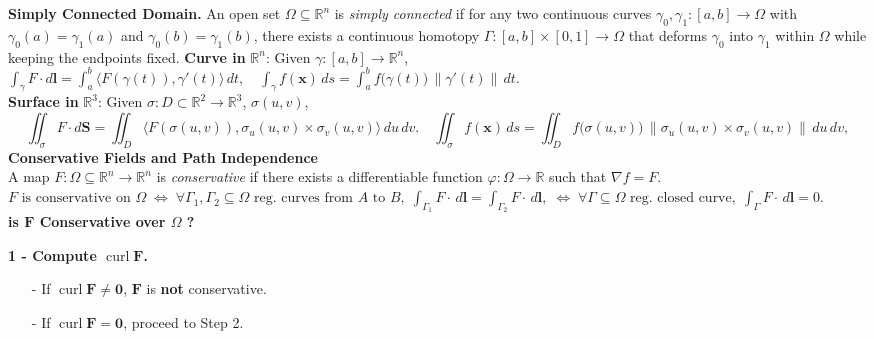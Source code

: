 \documentclass[8pt]{article}
\begin{document}
\smallskip
\noindent\textbf{Simply Connected Domain.}
An open set $\Omega \subseteq \mathbb{R}^n$ is \emph{simply connected} if for any two continuous curves
$\gamma_0, \gamma_1 : [a,b] \to \Omega$
with $\gamma_0(a) = \gamma_1(a)$ and $\gamma_0(b) = \gamma_1(b)$,
there exists a continuous homotopy
$\Gamma : [a,b]\times[0,1] \to \Omega$
that deforms $\gamma_0$ into $\gamma_1$ within $\Omega$ while keeping the endpoints fixed.
\smallskip \newline
\noindent\textbf{Curve in } $\mathbb{R}^n$: Given $\gamma : [a,b] \to \mathbb{R}^n$,$ \int_{\gamma} F \cdot d\mathbf{l} = \int_a^b \big\langle F(\gamma(t)), \gamma'(t)\big\rangle \, dt, \quad \int_{\gamma} f(\mathbf{x}) \, ds = \int_a^b f\big(\gamma(t)\big)\,\|\gamma'(t)\| \, dt.$\\
\noindent\textbf{Surface in } $\mathbb{R}^3$:
Given $\sigma : D \subset \mathbb{R}^2 \to \mathbb{R}^3$, $\sigma(u,v)$, \vspace{-10px}
\[
\iint_{\sigma} F \cdot d\mathbf{S}
= \iint_D \big\langle F(\sigma(u,v)), \sigma_u(u,v)\times\sigma_v(u,v)\big\rangle \,du\,dv.
\quad
\iint_{\sigma} f(\mathbf{x}) \, ds
= \iint_D f\big(\sigma(u,v)\big)\,\|\sigma_u(u,v)\times\sigma_v(u,v)\| \,du\,dv,
\]
\noindent \textbf{Conservative Fields and Path Independence}\\
A map \( F : \Omega \subseteq \mathbb{R}^n \to \mathbb{R}^n \) is \emph{conservative} if there exists a differentiable function \( \varphi : \Omega \to \mathbb{R} \) such that \( \nabla f = F \).\\
\small
$
F \text{ is conservative on } \Omega \; \iff \;
\forall \Gamma_1, \Gamma_2 \subseteq \Omega \text{ reg. curves from } A \text{ to } B, \; \int_{\Gamma_1} F \cdot \, d\mathbf{l} = \int_{\Gamma_2} F \cdot \, d\mathbf{l}, \;
\iff \; \forall \Gamma \subseteq \Omega \text{ reg. closed curve}, \; \int_{\Gamma} F \cdot \, d\mathbf{l} = 0.
$\\
\normalsize
\noindent\textbf{is $\mathbf{F}$ Conservative over $\Omega$ ?}\newline
\begin{minipage}[t]{0.17\textwidth}
    \noindent\textbf{1 - Compute $\operatorname{curl} \mathbf{F}$.} \vspace{-8px}
    \begin{itemize}[leftmargin=*]
        \setlength\itemsep{-4px}
        \item[-] If $\operatorname{curl} \mathbf{F} \neq \mathbf{0}$, $\mathbf{F}$ is \textbf{not} conservative.
        \item[-] If $\operatorname{curl} \mathbf{F} = \mathbf{0}$, proceed to Step 2.
    \end{itemize}
\end{minipage}
\end{document}
